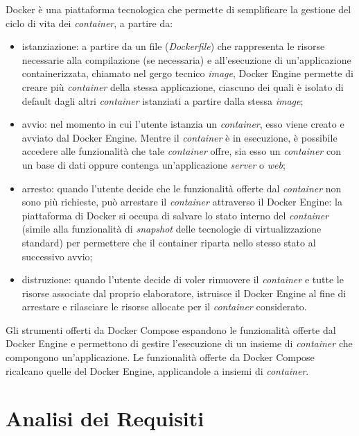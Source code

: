 Docker è una piattaforma tecnologica che permette di semplificare la gestione del ciclo di vita dei \emph{container}, a partire da:
\begin{itemize}
	\item istanziazione: a partire da un file (\emph{Dockerfile}) che rappresenta le risorse necessarie alla compilazione (se necessaria) e all'esecuzione di un'applicazione containerizzata, chiamato nel gergo tecnico \emph{image}, Docker Engine permette di creare più \emph{container} della stessa applicazione, ciascuno dei quali è isolato di default dagli altri \emph{container} istanziati a partire dalla stessa \emph{image};
	\item avvio: nel momento in cui l'utente istanzia un \emph{container}, esso viene creato e avviato dal Docker Engine. Mentre il \emph{container} è in esecuzione, è possibile accedere alle funzionalità che tale \emph{container} offre, sia esso un \emph{container} con un base di dati oppure contenga un'applicazione \emph{server} o \emph{web};
	\item arresto: quando l'utente decide che le funzionalità offerte dal \emph{container} non sono più richieste, può arrestare il \emph{container} attraverso il Docker Engine: la piattaforma di Docker si occupa di salvare lo stato interno del \emph{container} (simile alla funzionalità di \emph{snapshot} delle tecnologie di virtualizzazione standard) per permettere che il container riparta nello stesso stato al successivo avvio;
	\item distruzione: quando l'utente decide di voler rimuovere il \emph{container} e tutte le risorse associate dal proprio elaboratore, istruisce il Docker Engine al fine di arrestare e rilasciare le risorse allocate per il \emph{container} considerato. 
\end{itemize} 
Gli strumenti offerti da Docker Compose espandono le funzionalità offerte dal Docker Engine e permettono di gestire l'esecuzione di un insieme di \emph{container} che compongono un'applicazione. Le funzionalità offerte da Docker Compose ricalcano quelle del Docker Engine, applicandole a insiemi di \emph{container}.

\section{Analisi dei Requisiti}
\label{ar}

